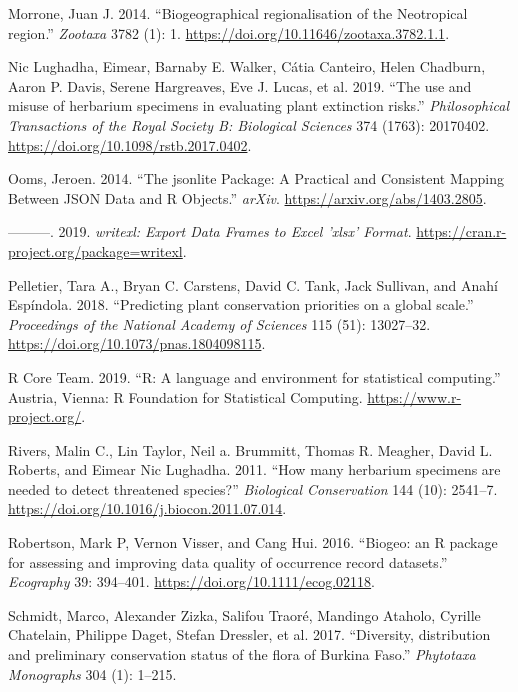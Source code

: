 \documentclass[fleqn,10pt,lineno]{wlpeerj} %
\begin{document}
\leavevmode\hypertarget{ref-Morrone2014}{}%
Morrone, Juan J. 2014. ``Biogeographical regionalisation of the Neotropical region.'' \emph{Zootaxa} 3782 (1): 1. \url{https://doi.org/10.11646/zootaxa.3782.1.1}.

\leavevmode\hypertarget{ref-NicLughadha2019}{}%
Nic Lughadha, Eimear, Barnaby E. Walker, Cátia Canteiro, Helen Chadburn, Aaron P. Davis, Serene Hargreaves, Eve J. Lucas, et al. 2019. ``The use and misuse of herbarium specimens in evaluating plant extinction risks.'' \emph{Philosophical Transactions of the Royal Society B: Biological Sciences} 374 (1763): 20170402. \url{https://doi.org/10.1098/rstb.2017.0402}.

\leavevmode\hypertarget{ref-Ooms2014}{}%
Ooms, Jeroen. 2014. ``The jsonlite Package: A Practical and Consistent Mapping Between JSON Data and R Objects.'' \emph{arXiv}. \url{https://arxiv.org/abs/1403.2805}.

\leavevmode\hypertarget{ref-Ooms2019}{}%
---------. 2019. \emph{writexl: Export Data Frames to Excel 'xlsx' Format}. \url{https://cran.r-project.org/package=writexl}.

\leavevmode\hypertarget{ref-Pelletier2018}{}%
Pelletier, Tara A., Bryan C. Carstens, David C. Tank, Jack Sullivan, and Anahí Espíndola. 2018. ``Predicting plant conservation priorities on a global scale.'' \emph{Proceedings of the National Academy of Sciences} 115 (51): 13027--32. \url{https://doi.org/10.1073/pnas.1804098115}.

\leavevmode\hypertarget{ref-rcoreteam2019}{}%
R Core Team. 2019. ``R: A language and environment for statistical computing.'' Austria, Vienna: R Foundation for Statistical Computing. \url{https://www.r-project.org/}.

\leavevmode\hypertarget{ref-Rivers2011}{}%
Rivers, Malin C., Lin Taylor, Neil a. Brummitt, Thomas R. Meagher, David L. Roberts, and Eimear Nic Lughadha. 2011. ``How many herbarium specimens are needed to detect threatened species?'' \emph{Biological Conservation} 144 (10): 2541--7. \url{https://doi.org/10.1016/j.biocon.2011.07.014}.

\leavevmode\hypertarget{ref-Robertson2016}{}%
Robertson, Mark P, Vernon Visser, and Cang Hui. 2016. ``Biogeo: an R package for assessing and improving data quality of occurrence record datasets.'' \emph{Ecography} 39: 394--401. \url{https://doi.org/10.1111/ecog.02118}.

\leavevmode\hypertarget{ref-Schmidt2017}{}%
Schmidt, Marco, Alexander Zizka, Salifou Traoré, Mandingo Ataholo, Cyrille Chatelain, Philippe Daget, Stefan Dressler, et al. 2017. ``Diversity, distribution and preliminary conservation status of the flora of Burkina Faso.'' \emph{Phytotaxa Monographs} 304 (1): 1--215.
\end{document}
